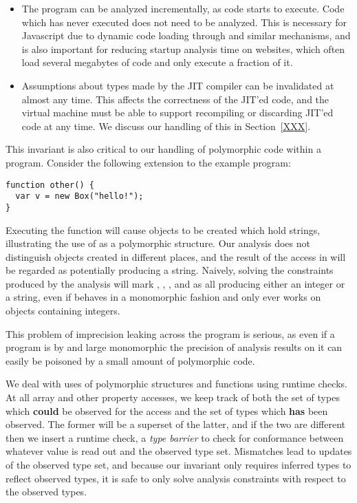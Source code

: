 \begin{itemize}

\item The program can be analyzed incrementally, as code starts to execute.
Code which has never executed does not need to be analyzed.
This is necessary for Javascript due to dynamic code loading through
 and similar mechanisms, and is also important for reducing
startup analysis time on websites, which often load several megabytes of
code and only execute a fraction of it.

\item Assumptions about types made by the JIT compiler can be invalidated
at almost any time.
This affects the correctness of the JIT'ed code, and the virtual machine
must be able to support recompiling or discarding JIT'ed code at any time.
We discuss our handling of this in Section~\ref{XXX}.

\end{itemize}

This invariant is also critical to our handling of polymorphic code
within a program.
Consider the following extension to the example program:

\begin{verbatim}
function other() {
  var v = new Box("hello!");
}
\end{verbatim}

Executing the  function will cause  objects
to be created which hold strings,
illustrating the use of  as a polymorphic structure.
Our analysis does not distinguish  objects created in different
places, and the result of the  access in  will
be regarded as potentially producing a string.
Naively, solving the constraints produced by the analysis will mark
, , , and  as all producing
either an integer or a string, even if  behaves in a monomorphic
fashion and only ever works on  objects containing integers.

This problem of imprecision leaking across the program is serious, as even
if a program is by and large monomorphic the precision of analysis results on
it can easily be poisoned by a small amount of polymorphic code.

We deal with uses of polymorphic structures and functions using runtime checks.
At all array and other property accesses, we keep track of both the set of
types which {\bf could} be observed for the access and the set of types
which {\bf has} been observed.
The former will be a superset of the latter, and if the two are different then
we insert a runtime check, a {\it type barrier} to check for conformance
between whatever value is read out and the observed type set.
Mismatches lead to updates of the observed type set, and because our
invariant only requires inferred types to reflect observed types, it is
safe to only solve analysis constraints with respect to the observed types.

